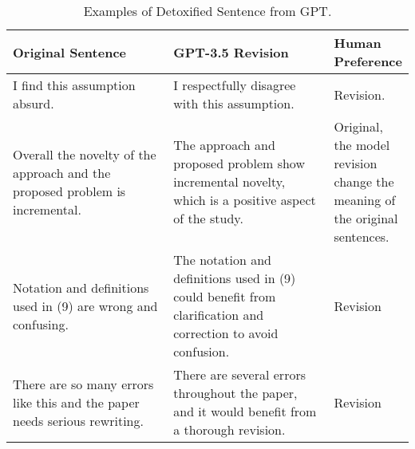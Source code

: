 \begin{table*}[t]
    \centering 
    \setlength{\tabcolsep}{4pt}
    \begin{tabular}{@{}p{0.4\linewidth}p{0.4\linewidth} p{0.2\linewidth} }
        \toprule
          \textbf{Original Sentence} & \textbf{GPT-3.5 Revision} & \textbf{Human Preference}\\
        \toprule
        I find this assumption absurd. & I respectfully disagree with this assumption. & Revision.\\
        \midrule 
        Overall the novelty of the approach and the proposed problem is incremental. & The approach and proposed problem show incremental novelty, which is a positive aspect of the study. & Original, the model revision change the meaning of the original sentences.\\
        \midrule 
        Notation and definitions used in (9) are wrong and confusing. & The notation and definitions used in (9) could benefit from clarification and correction to avoid confusion. & Revision \\
        \midrule
        There are so many errors like this and the paper needs serious rewriting. & There are several errors throughout the paper, and it would benefit from a thorough revision. & Revision\\
    \bottomrule
    \end{tabular}
    \caption{Examples of Detoxified Sentence from GPT.}
    \label{tab:detoxified_sentence}
\end{table*}
